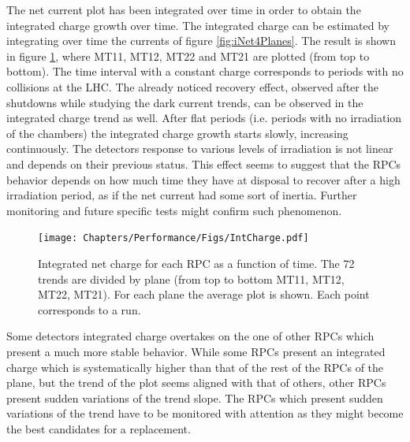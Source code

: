 The net current plot has been integrated over time in order to obtain the integrated charge growth over time.
The integrated charge can be estimated by integrating over time the currents of figure \ref{fig:iNet4Planes}. 
The result is shown in figure \ref{fig:ICharge4Planes}, where MT11, MT12, MT22 and MT21 are plotted (from top to bottom). 
The time interval with a constant charge corresponds to periods with no collisions at the LHC.
The already noticed recovery effect, observed after the shutdowns while studying the dark current trends, can be observed in the integrated charge trend as well.
After flat periods (i.e. periods with no irradiation of the chambers) the integrated charge growth starts slowly, increasing continuously.
The detectors response to various levels of irradiation is not linear and depends on their previous status.
This effect seems to suggest that the RPCs behavior depends on how much time they have at disposal to recover after a high irradiation period, as if the net current had some sort of inertia.
Further monitoring and future specific tests might confirm such phenomenon.

\begin{figure}[!t]
\begin{center}
\texttt{[image: Chapters/Performance/Figs/IntCharge.pdf]}
\caption{Integrated net charge for each RPC as a function of time. The 72 trends are divided by plane (from top to bottom MT11, MT12, MT22, MT21). For each plane the average plot is shown. Each point corresponds to a run.}
\label{fig:ICharge4Planes}
\end{center}
\end{figure}

Some detectors integrated charge overtakes on the one of other RPCs which present a much more stable behavior.
While some RPCs present an integrated charge which is systematically higher than that of the rest of the RPCs of the plane, but the trend of the plot seems aligned with that of others, other RPCs present sudden variations of the trend slope.
The RPCs which present sudden variations of the trend have to be monitored with attention as they might become the best candidates for a replacement.

